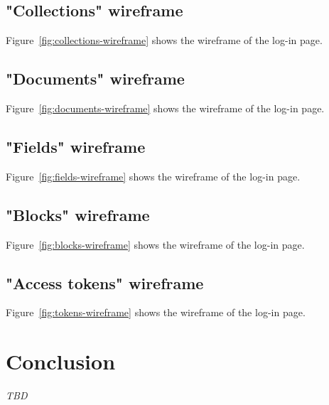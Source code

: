 
\subsection{"Collections" wireframe}
Figure~\ref{fig:collections-wireframe} shows the wireframe of the log-in page.


\subsection{"Documents" wireframe}
Figure~\ref{fig:documents-wireframe} shows the wireframe of the log-in page.


\subsection{"Fields" wireframe}
Figure~\ref{fig:fields-wireframe} shows the wireframe of the log-in page.


\subsection{"Blocks" wireframe}
Figure~\ref{fig:blocks-wireframe} shows the wireframe of the log-in page.


\subsection{"Access tokens" wireframe}
Figure~\ref{fig:tokens-wireframe} shows the wireframe of the log-in page.


\section{Conclusion}

\emph{TBD}